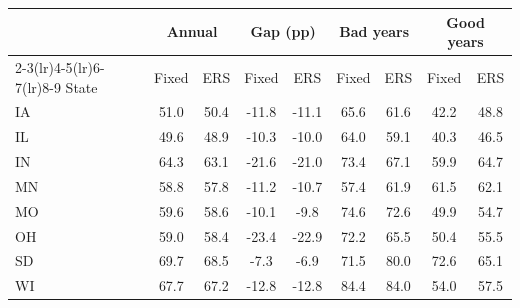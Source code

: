 \begin{tabular}{lcccccccc}
\toprule
 & \multicolumn{2}{c}{Annual} & \multicolumn{2}{c}{Gap (pp)} & \multicolumn{2}{c}{Bad years} & \multicolumn{2}{c}{Good years}\\
\cmidrule(lr){2-3}\cmidrule(lr){4-5}\cmidrule(lr){6-7}\cmidrule(lr){8-9}
State & Fixed & ERS & Fixed & ERS & Fixed & ERS & Fixed & ERS\\
\midrule
IA & 51.0 & 50.4 & -11.8 & -11.1 & 65.6 & 61.6 & 42.2 & 48.8 \\
IL & 49.6 & 48.9 & -10.3 & -10.0 & 64.0 & 59.1 & 40.3 & 46.5 \\
IN & 64.3 & 63.1 & -21.6 & -21.0 & 73.4 & 67.1 & 59.9 & 64.7 \\
MN & 58.8 & 57.8 & -11.2 & -10.7 & 57.4 & 61.9 & 61.5 & 62.1 \\
MO & 59.6 & 58.6 & -10.1 & -9.8 & 74.6 & 72.6 & 49.9 & 54.7 \\
OH & 59.0 & 58.4 & -23.4 & -22.9 & 72.2 & 65.5 & 50.4 & 55.5 \\
SD & 69.7 & 68.5 & -7.3 & -6.9 & 71.5 & 80.0 & 72.6 & 65.1 \\
WI & 67.7 & 67.2 & -12.8 & -12.8 & 84.4 & 84.0 & 54.0 & 57.5 \\
\bottomrule
\end{tabular}
